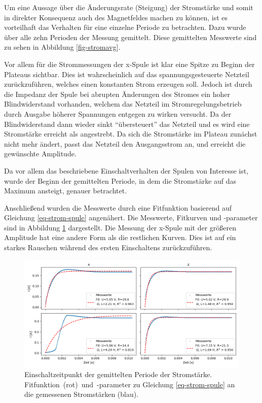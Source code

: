 \documentclass[page,pdftex,12pt,a4paper,twoside,openright]{scrbook}
\begin{document}
Um eine Aussage über die Änderungsrate (Steigung) der Stromstärke und somit in direkter Konsequenz auch des Magnetfeldes machen zu können, ist es vorteilhaft das Verhalten für eine einzelne Periode zu betrachten. Dazu wurde über alle zehn Perioden der Messung gemittelt. Diese gemittelten Messwerte sind zu sehen in Abbildung \ref{fig-stromavg}.

Vor allem für die Strommessungen der x-Spule ist klar eine Spitze zu Beginn der Plateaus sichtbar. Dies ist wahrscheinlich auf das spannungsgesteuerte Netzteil zurückzuführen, welches einen konstanten Strom erzeugen soll. Jedoch ist durch die Impedanz der Spule bei abrupten Änderungen des Stromes ein hoher Blindwiderstand vorhanden, welchem das Netzteil im Stromregelungsbetrieb durch Ausgabe höherer Spannungen entgegen zu wirken versucht. Da der Blindwiderstand dann wieder sinkt "`übersteuert"' das Netzteil und es wird eine Stromstärke erreicht als angestrebt. Da sich die Stromstärke im Plateau zunächst nicht mehr ändert, passt das Netzteil den Ausgangsstrom an, und erreicht die gewünschte Amplitude.

Da vor allem das beschriebene Einschaltverhalten der Spulen von Interesse ist, wurde der Beginn der gemittelten Periode, in dem die Stromstärke auf das Maximum ansteigt, genauer betrachtet.

Anschließend wurden die Messwerte durch eine Fitfunktion basierend auf Gleichung \ref{eq-strom-spule} angenähert. Die Messwerte, Fitkurven und -parameter sind in Abbildung \ref{fig-stromfit} dargestellt. Die Messung der x-Spule mit der größeren Amplitude hat eine andere Form als die restlichen Kurven. Dies ist auf ein starkes Rauschen während des ersten Einschaltens zurückzuführen.

\begin{figure}[h]
\centering
\includegraphics[width=\textwidth]{img/strom_fit.png}
\caption{\label{fig-stromfit}
Einschaltzeitpunkt der gemittelten Periode der Stromstärke. \mbox{Fitfunktion (rot) und -parameter} zu Gleichung \ref{eq-strom-spule} an die gemessenen Stromstärken (blau).}
\end{figure}
\end{document}
